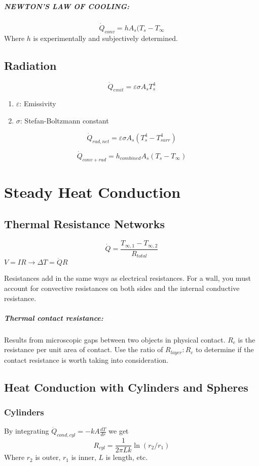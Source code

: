 \documentclass[a4paper,12pt]{report}
\begin{document}
\paragraph{NEWTON'S LAW OF COOLING: }
$$\dot{Q}_{conv} = hA_s(T_s-T_{\infty}$$
Where $h$ is experimentally and subjectively determined.

\section{Radiation}
$$\dot{Q}_{emit} = \varepsilon \sigma A_s T_s^4$$
\begin{enumerate}
\item $\varepsilon$: Emissivity
\item $\sigma$: Stefan-Boltzmann constant
\end{enumerate}
$$\dot{Q}_{rad, net} = \varepsilon \sigma A_s(T_s^4 - T_{surr}^4)$$

$$\dot{Q}_{conv+rad} = h_{combined}A_s(T_s-T_{\infty})$$

\chapter{Steady Heat Conduction}
\section{Thermal Resistance Networks}
$$\dot{Q}=\frac{T_{\infty,1} - T_{\infty,2}}{R_{total}}$$
$V = IR \to \Delta T = \dot{Q}R$

Resistances add in the same ways as electrical resistances. For a wall, you must account for convective resistances on both sides and the 
internal conductive resistance.

\paragraph{Thermal contact resistance: } Results from microscopic gaps between two objects in physical contact. $R_c$ is the resistance 
per unit area of contact. Use the ratio of $R_{layer} : R_c$ to determine if the contact resistance is worth taking into consideration.

\section{Heat Conduction with Cylinders and Spheres}
\subsection{Cylinders}
By integrating $\dot{Q}_{cond, cyl} = -kA\frac{dT}{dr}$ we get $$R_{cyl} = \frac{1}{2\pi Lk}\ln(r_2/r_1)$$
Where $r_2$ is outer, $r_1$ is inner, $L$ is length, etc.
\end{document}

